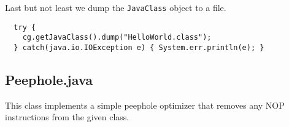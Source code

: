 Last but not least we dump the \texttt{JavaClass} object to a file.

{\small\begin{verbatim}
  try {
    cg.getJavaClass().dump("HelloWorld.class");
  } catch(java.io.IOException e) { System.err.println(e); }
\end{verbatim}}

\subsection{Peephole.java}

This class implements a simple peephole optimizer that removes any NOP
instructions from the given class.

{\small{}}\label{sec:nop}
